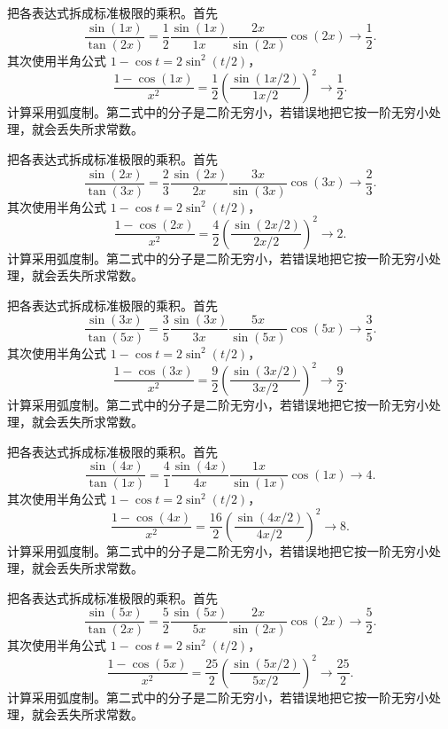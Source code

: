 \documentclass[12pt,fontset=fandol]{ctexart}
\begin{document}
\begin{solve}\label{ans:c3q8}
把各表达式拆成标准极限的乘积。首先
\[
\frac{\sin(1x)}{\tan(2x)}=\frac{1}{2}\frac{\sin(1x)}{1x}\frac{2x}{\sin(2x)}\cos(2x)\longrightarrow \frac{1}{2}.
\]
其次使用半角公式 $1-\cos t=2\sin^2(t/2)$，
\[
\frac{1-\cos(1x)}{x^2}=\frac{1}2\left(\frac{\sin(1x/2)}{1x/2}\right)^2\longrightarrow \frac{1}{2}.
\]
计算采用弧度制。第二式中的分子是二阶无穷小，若错误地把它按一阶无穷小处理，就会丢失所求常数。
\end{solve}

\begin{solve}\label{ans:c3q9}
把各表达式拆成标准极限的乘积。首先
\[
\frac{\sin(2x)}{\tan(3x)}=\frac{2}{3}\frac{\sin(2x)}{2x}\frac{3x}{\sin(3x)}\cos(3x)\longrightarrow \frac{2}{3}.
\]
其次使用半角公式 $1-\cos t=2\sin^2(t/2)$，
\[
\frac{1-\cos(2x)}{x^2}=\frac{4}2\left(\frac{\sin(2x/2)}{2x/2}\right)^2\longrightarrow 2.
\]
计算采用弧度制。第二式中的分子是二阶无穷小，若错误地把它按一阶无穷小处理，就会丢失所求常数。
\end{solve}

\begin{solve}\label{ans:c3q10}
把各表达式拆成标准极限的乘积。首先
\[
\frac{\sin(3x)}{\tan(5x)}=\frac{3}{5}\frac{\sin(3x)}{3x}\frac{5x}{\sin(5x)}\cos(5x)\longrightarrow \frac{3}{5}.
\]
其次使用半角公式 $1-\cos t=2\sin^2(t/2)$，
\[
\frac{1-\cos(3x)}{x^2}=\frac{9}2\left(\frac{\sin(3x/2)}{3x/2}\right)^2\longrightarrow \frac{9}{2}.
\]
计算采用弧度制。第二式中的分子是二阶无穷小，若错误地把它按一阶无穷小处理，就会丢失所求常数。
\end{solve}

\begin{solve}\label{ans:c3q11}
把各表达式拆成标准极限的乘积。首先
\[
\frac{\sin(4x)}{\tan(1x)}=\frac{4}{1}\frac{\sin(4x)}{4x}\frac{1x}{\sin(1x)}\cos(1x)\longrightarrow 4.
\]
其次使用半角公式 $1-\cos t=2\sin^2(t/2)$，
\[
\frac{1-\cos(4x)}{x^2}=\frac{16}2\left(\frac{\sin(4x/2)}{4x/2}\right)^2\longrightarrow 8.
\]
计算采用弧度制。第二式中的分子是二阶无穷小，若错误地把它按一阶无穷小处理，就会丢失所求常数。
\end{solve}

\begin{solve}\label{ans:c3q12}
把各表达式拆成标准极限的乘积。首先
\[
\frac{\sin(5x)}{\tan(2x)}=\frac{5}{2}\frac{\sin(5x)}{5x}\frac{2x}{\sin(2x)}\cos(2x)\longrightarrow \frac{5}{2}.
\]
其次使用半角公式 $1-\cos t=2\sin^2(t/2)$，
\[
\frac{1-\cos(5x)}{x^2}=\frac{25}2\left(\frac{\sin(5x/2)}{5x/2}\right)^2\longrightarrow \frac{25}{2}.
\]
计算采用弧度制。第二式中的分子是二阶无穷小，若错误地把它按一阶无穷小处理，就会丢失所求常数。
\end{solve}
\end{document}
